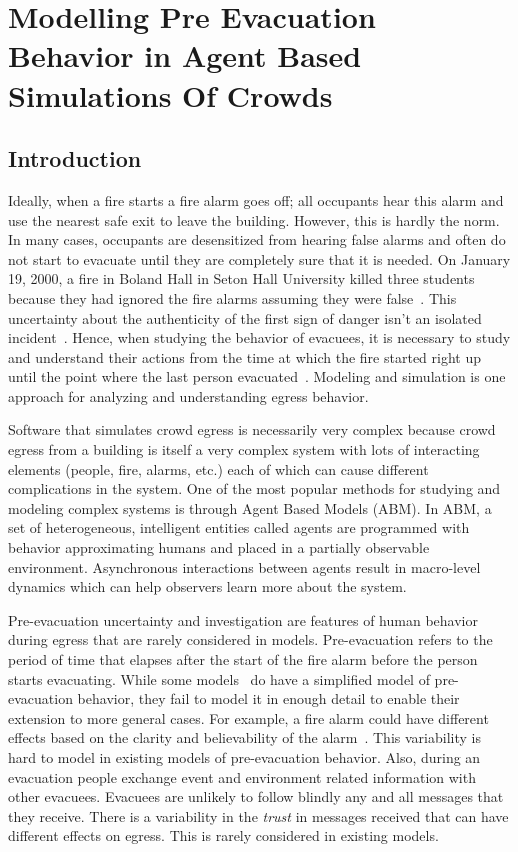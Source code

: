 
\chapter{Modelling Pre Evacuation Behavior in Agent Based Simulations Of Crowds}
\label{chapter:PreEvacuationBehavior}

\section{Introduction}
\label{intro}
Ideally, when a fire starts a fire alarm goes off; all occupants hear this alarm and use the nearest safe exit to leave the building. However, this is hardly the norm. In many cases, occupants are desensitized from hearing false alarms and often do not start to evacuate until they are completely sure that it is needed. On January 19, 2000, a fire in Boland Hall in Seton Hall University killed three students because they had ignored the fire alarms assuming they were false~\cite{Berry:2000us}. This uncertainty about the authenticity of the first sign of danger isn't an isolated incident~\cite{Proulx:2003tc,Purser:2001ts,Tong:1985wn}. Hence, when studying the behavior of evacuees, it is necessary to study and understand their actions from the time at which the fire started right up until the point where the last person evacuated~\cite{Tong:1985wn}. Modeling and simulation is one approach for analyzing and understanding egress behavior.

Software that simulates crowd egress is necessarily very complex because crowd egress from a building is itself a very complex system with lots of interacting elements (people, fire, alarms, etc.) each of which can cause different complications in the system. One of the most popular methods for studying and modeling complex systems is through Agent Based Models (ABM). In ABM, a set of heterogeneous, intelligent entities called agents are programmed with behavior approximating humans and placed in a partially observable environment. Asynchronous interactions between agents result in macro-level dynamics which can help observers learn more about the system.

Pre-evacuation uncertainty and investigation are features of human behavior during egress that are rarely considered in models. Pre-evacuation refers to the period of time that elapses after the start of the fire alarm before the person starts evacuating. While some models~\cite{Tsai:2011tz} do have a simplified model of pre-evacuation behavior, they fail to model it in enough detail to enable their extension to more general cases. For example, a fire alarm could have different effects based on the clarity and believability of the alarm~\cite{Kobes:2009jx,Paulsen:1984ti}. This variability is hard to model in existing models of pre-evacuation behavior. Also, during an evacuation people exchange event and environment related information with other evacuees. Evacuees are unlikely to follow blindly any and all messages that they receive. There is a variability in the \emph{trust} in messages received that can have different effects on egress. This is rarely considered in existing models.


